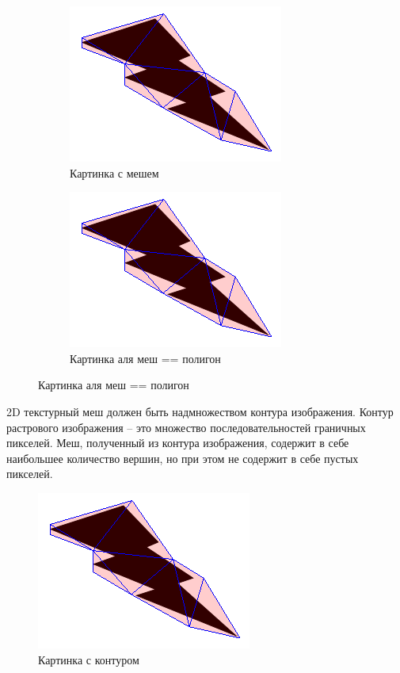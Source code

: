 \documentclass{fefu_thesis/cls/fefu}
\begin{document}
    \begin{figure}[H]
        \centering
        \begin{subfigure}[c]{.49\linewidth}
            \includegraphics{images/Thunder_approx.png}
            \caption{Картинка с мешем}
        \end{subfigure}
        \begin{subfigure}[c]{.49\linewidth}
            \includegraphics{images/Thunder_approx.png}
            \caption{Картинка аля меш == полигон}
        \end{subfigure}
    \end{figure}

    2D текстурный меш должен быть надмножеством контура изображения. Контур растрового изображения -- это множество последовательностей граничных пикселей. Меш, полученный из контура изображения, содержит в себе наибольшее количество вершин, но при этом не содержит в себе пустых пикселей.

    \begin{figure}[H]
        \centering
        \includegraphics{images/Thunder_approx.png}
        \caption{Картинка с контуром}
    \end{figure}
\end{document}
